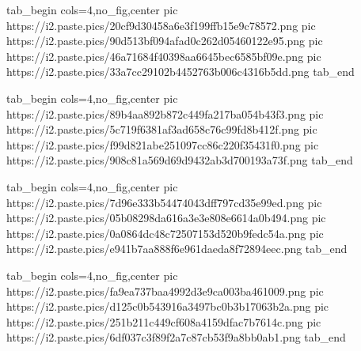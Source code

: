  
 
 
 
 
\zzSecCmtScr

\ifcmt
  tab_begin cols=4,no_fig,center
     pic https://i2.paste.pics/20cf9d30458a6e3f199ffb15e9c78572.png
     pic https://i2.paste.pics/90d513bf094afad0c262d05460122e95.png
     pic https://i2.paste.pics/46a71684f40398aa6645bec6585bf09e.png
     pic https://i2.paste.pics/33a7cc29102b4452763b006c4316b5dd.png
  tab_end
\fi

\ifcmt
  tab_begin cols=4,no_fig,center
     pic https://i2.paste.pics/89b4aa892b872c449fa217ba054b43f3.png
     pic https://i2.paste.pics/5c719f6381af3ad658c76c99fd8b412f.png
     pic https://i2.paste.pics/f99d821abe251097cc86c220f35431f0.png
     pic https://i2.paste.pics/908c81a569d69d9432ab3d700193a73f.png
  tab_end
\fi

\ifcmt
  tab_begin cols=4,no_fig,center
     pic https://i2.paste.pics/7d96e333b54474043dff797cd35e99ed.png
     pic https://i2.paste.pics/05b08298da616a3e3e808e6614a0b494.png
     pic https://i2.paste.pics/0a0864dc48c72507153d520b9fedc54a.png
     pic https://i2.paste.pics/e941b7aa888f6e961daeda8f72894eec.png
  tab_end
\fi

\ifcmt
  tab_begin cols=4,no_fig,center
     pic https://i2.paste.pics/fa9ea737baa4992d3e9ca003ba461009.png
     pic https://i2.paste.pics/d125c0b543916a3497bc0b3b17063b2a.png
     pic https://i2.paste.pics/251b211c449cf608a4159dfac7b7614c.png
     pic https://i2.paste.pics/6df037c3f89f2a7c87cb53f9a8bb0ab1.png
  tab_end
\fi
